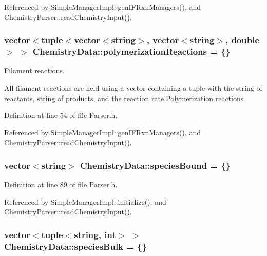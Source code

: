 Referenced by Simple\+Manager\+Impl\+::gen\+I\+F\+Rxn\+Managers(), and Chemistry\+Parser\+::read\+Chemistry\+Input().

\hypertarget{structChemistryData_a407c6129330a3cffc5afb45f83936945}{
\subsubsection[{polymerization\+Reactions}]{\setlength{\rightskip}{0pt plus 5cm}vector$<$tuple$<$vector$<$string$>$, vector$<$string$>$, double$>$ $>$ Chemistry\+Data\+::polymerization\+Reactions = \{\}}}\label{structChemistryData_a407c6129330a3cffc5afb45f83936945}


\hyperlink{classFilament}{Filament} reactions. 

All filament reactions are held using a vector containing a tuple with the string of reactants, string of products, and the reaction rate.\+Polymerization reactions 

Definition at line 54 of file Parser.\+h.



Referenced by Simple\+Manager\+Impl\+::gen\+I\+F\+Rxn\+Managers(), and Chemistry\+Parser\+::read\+Chemistry\+Input().

\hypertarget{structChemistryData_acab0ca129148f43eaa33847782411b3a}{
\subsubsection[{species\+Bound}]{\setlength{\rightskip}{0pt plus 5cm}vector$<$string$>$ Chemistry\+Data\+::species\+Bound = \{\}}}\label{structChemistryData_acab0ca129148f43eaa33847782411b3a}


Definition at line 89 of file Parser.\+h.



Referenced by Simple\+Manager\+Impl\+::initialize(), and Chemistry\+Parser\+::read\+Chemistry\+Input().

\hypertarget{structChemistryData_ae9c303af6cd6b503fe45515c4ee5132b}{
\subsubsection[{species\+Bulk}]{\setlength{\rightskip}{0pt plus 5cm}vector$<$tuple$<$string, int$>$ $>$ Chemistry\+Data\+::species\+Bulk = \{\}}}\label{structChemistryData_ae9c303af6cd6b503fe45515c4ee5132b}


